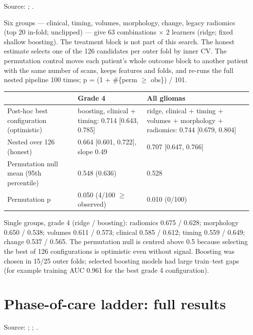 \documentclass[11pt,a4paper]{article}
\begin{document}
Source: ;
.

Six groups --- clinical, timing, volumes, morphology, change, legacy radiomics (top 20 in-fold; unclipped) ---
give 63 combinations $\times$ 2 learners (ridge; fixed shallow boosting). The treatment block is not part of
this search. The honest estimate selects one of the 126 candidates per outer fold by inner CV. The permutation
control moves each patient's whole outcome block to another patient with the same number of scans, keeps
features and folds, and re-runs the full nested pipeline 100 times; p = (1 + \#\{perm $\geq$ obs\}) / 101.

\begin{table}[H]
\centering
\small
\begin{tabularx}{\linewidth}{@{}R{4.6cm} L L@{}}
\toprule
 & Grade 4 & All gliomas \\
\midrule
Post-hoc best configuration (optimistic) & boosting, clinical + timing: 0.714 [0.643, 0.785] & ridge, clinical + timing + volumes + morphology + radiomics: 0.744 [0.679, 0.804] \\
Nested over 126 (honest) & 0.664 [0.601, 0.722], slope 0.49 & 0.707 [0.647, 0.766] \\
Permutation null mean (95th percentile) & 0.548 (0.636) & 0.528 \\
Permutation p & 0.050 (4/100 $\geq$ observed) & 0.010 (0/100) \\
\bottomrule
\end{tabularx}
\end{table}

Single groups, grade 4 (ridge / boosting): radiomics 0.675 / 0.628; morphology 0.650 / 0.538; volumes 0.611 /
0.573; clinical 0.585 / 0.612; timing 0.559 / 0.649; change 0.537 / 0.565. The permutation null is centred
above 0.5 because selecting the best of 126 configurations is optimistic even without signal. Boosting was
chosen in 15/25 outer folds; selected boosting models had large train--test gaps (for example training AUC
0.961 for the best grade 4 configuration).

\FloatBarrier
\section{Phase-of-care ladder: full results}\label{sec:S11}

Source: ;
;
.
\end{document}
